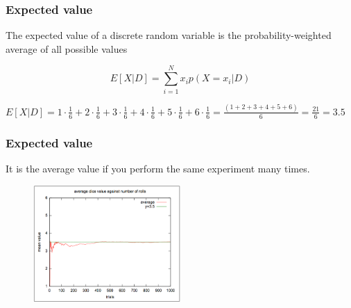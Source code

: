 
\begin{frame}
\frametitle{Expected value}

	The expected	value	of	a	discrete	random	variable	is	the probability-weighted	average	of	all	possible	values

	\begin{equation*}
		E[X|D] = \sum_{i=1}^N x_i p(X=x_i|D)
	\end{equation*}
	
	\pause

	
		$E[X|D] = 1 \cdot \frac{1}{6} + 2 \cdot \frac{1}{6} + 3 \cdot \frac{1}{6} + 4 \cdot \frac{1}{6} + 5 \cdot \frac{1}{6} +6 \cdot \frac{1}{6} = \frac{(1+2+3+4+5+6)}{6} = \frac{21}{6} = 3.5$

\end{frame}


\begin{frame}
\frametitle{Expected value}

		It is the average value if you perform the same experiment many times.

        	\begin{figure}
                	\includegraphics[width=0.5\textwidth]{Pics/die_tries.png}
        	\end{figure}

\end{frame}


